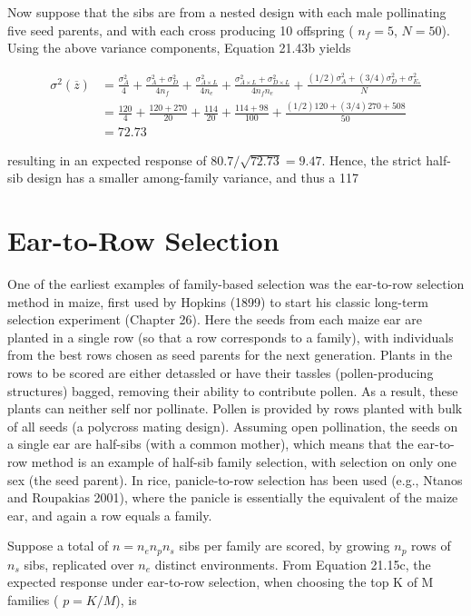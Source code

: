 \documentclass{article}
\begin{document}
Now suppose that the sibs are from a nested design with each male pollinating five seed parents, and with each cross producing 10 offspring ( $ n_f = 5 $,  $ N = 50 $). Using the above variance components, Equation 21.43b yields

\begin{equation}
\begin{aligned}\sigma^{2}(\overline{z})&=\frac{\sigma_{A}^{2}}{4}+\frac{\sigma_{A}^{2}+\sigma_{D}^{2}}{4n_{f}}+\frac{\sigma_{A\times L}^{2}}{4n_{e}}+\frac{\sigma_{A\times L}^{2}+\sigma_{D\times L}^{2}}{4n_{f}n_{e}}+\frac{(1/2)\sigma_{A}^{2}+(3/4)\sigma_{D}^{2}+\sigma_{E_{s}}^{2}}{N}\\&=\frac{120}{4}+\frac{120+270}{20}+\frac{114}{20}+\frac{114+98}{100}+\frac{(1/2)120+(3/4)270+508}{50}\\&=72.73\end{aligned}
\end{equation}

resulting in an expected response of  $ 80.7/\sqrt{72.73} = 9.47 $. Hence, the strict half-sib design has a smaller among-family variance, and thus a 117%

\section{Ear-to-Row Selection}
One of the earliest examples of family-based selection was the ear-to-row selection method in maize, first used by Hopkins (1899) to start his classic long-term selection experiment (Chapter 26). Here the seeds from each maize ear are planted in a single row (so that a row corresponds to a family), with individuals from the best rows chosen as seed parents for the next generation. Plants in the rows to be scored are either detassled or have their tassles (pollen-producing structures) bagged, removing their ability to contribute pollen. As a result, these plants can neither self nor pollinate. Pollen is provided by rows planted with bulk of all seeds (a polycross mating design). Assuming open pollination, the seeds on a single ear are half-sibs (with a common mother), which means that the ear-to-row method is an example of half-sib family selection, with selection on only one sex (the seed parent). In rice, panicle-to-row selection has been used (e.g., Ntanos and Roupakias 2001), where the panicle is essentially the equivalent of the maize ear, and again a row equals a family.

Suppose a total of  $ n = n_e n_p n_s $ sibs per family are scored, by growing  $ n_p $ rows of  $ n_s $ sibs, replicated over  $ n_e $ distinct environments. From Equation 21.15c, the expected response under ear-to-row selection, when choosing the top K of M families ( $ p = K/M $), is
\end{document}
